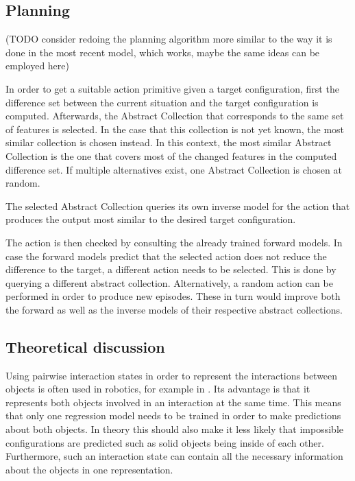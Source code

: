 \subsection{Planning}

(TODO consider redoing the planning algorithm more similar to the way it is done
in the most recent model, which works, maybe the same ideas can be employed 
here)

In order to get a suitable action primitive given a target configuration, first the 
difference set between the current situation and the target 
configuration is computed. Afterwards, the Abstract Collection that corresponds to the same set of features is selected. In the case that this collection is not yet known, the 
most similar collection is chosen instead. In this context, the most similar Abstract Collection is the one that covers most of the changed features in the computed difference set. If multiple alternatives exist, one Abstract Collection is chosen at random. 

The selected Abstract Collection queries its own inverse model for the 
action that produces the output most similar to the desired target configuration. 

The action is then checked by consulting the already trained forward models. In case the forward models predict that the selected action does not reduce the difference to the target, a different action needs to be selected. This is done by querying a different abstract collection. Alternatively, a random action can be performed in order to produce new episodes. These in turn would improve both the forward as well as the inverse models of their respective abstract collections.

\subsection{Theoretical discussion}
Using pairwise interaction states in order to represent the interactions between objects is often used in robotics, for example in \cite{pairwiseExamples}. Its advantage is that it represents both objects involved in an interaction at the same time. This means that only one regression model needs to be trained in order to make predictions about both objects. In theory this should also make it less likely that impossible configurations are predicted such as solid objects being inside of each other. Furthermore, such an interaction state can contain all the necessary information about the objects in one representation. 

